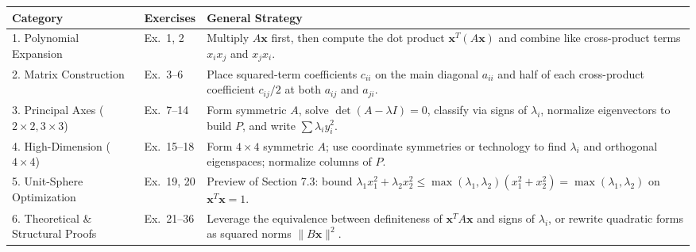 \documentclass[11pt, letterpaper]{article}
\theoremstyle{definition}
\theoremstyle{remark}
\begin{document}
\renewcommand{\arraystretch}{1.5}
\begin{tabularx}{\textwidth}{l l X}
\toprule
\textbf{Category} & \textbf{Exercises} & \textbf{General Strategy} \\
\midrule
1. Polynomial Expansion & Ex.\ 1, 2 & Multiply $A\mathbf{x}$ first, then compute the dot product $\mathbf{x}^T(A\mathbf{x})$ and combine like cross-product terms $x_i x_j$ and $x_j x_i$. \\
2. Matrix Construction & Ex.\ 3--6 & Place squared-term coefficients $c_{ii}$ on the main diagonal $a_{ii}$ and half of each cross-product coefficient $c_{ij}/2$ at both $a_{ij}$ and $a_{ji}$. \\
3. Principal Axes ($2\times 2, 3\times 3$) & Ex.\ 7--14 & Form symmetric $A$, solve $\det(A-\lambda I)=0$, classify via signs of $\lambda_i$, normalize eigenvectors to build $P$, and write $\sum \lambda_i y_i^2$. \\
4. High-Dimension ($4\times 4$) & Ex.\ 15--18 & Form $4\times 4$ symmetric $A$; use coordinate symmetries or technology to find $\lambda_i$ and orthogonal eigenspaces; normalize columns of $P$. \\
5. Unit-Sphere Optimization & Ex.\ 19, 20 & Preview of Section 7.3: bound $\lambda_1 x_1^2 + \lambda_2 x_2^2 \le \max(\lambda_1, \lambda_2)(x_1^2+x_2^2) = \max(\lambda_1, \lambda_2)$ on $\mathbf{x}^T\mathbf{x} = 1$. \\
6. Theoretical \& Structural Proofs & Ex.\ 21--36 & Leverage the equivalence between definiteness of $\mathbf{x}^T A\mathbf{x}$ and signs of $\lambda_i$, or rewrite quadratic forms as squared norms $\|B\mathbf{x}\|^2$. \\
\bottomrule
\end{tabularx}
\end{document}
